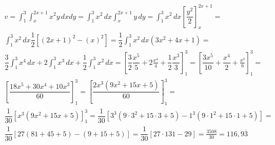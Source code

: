 \begin{enumerate}
	\begin{gather*}
		v = \int_1^3 \int_x^{2x + 1} x^2y\, dx dy = \int_1^3 x^2\, dx \int_x^{2x + 1} y\, dy =  \int_1^3 x^2\, dx \left[\dfrac{y^2}{2}\right]_x^{2x + 1} =\\  \int_1^3 x^2\, dx \dfrac{1}{2}\left[(2x + 1)^2 - (x)^2\right] = \dfrac{1}{2}\int_1^3 x^2\, dx \left(3x^2 + 4x + 1\right) =\\ \dfrac{3}{2}\int_1^3 x^4\, dx + 2\int_1^3 x^3\, dx + \dfrac{1}{2}\int_1^3 x^2\, dx = \left[\dfrac{3}{2}\dfrac{x^5}{5} + 2\frac{x^4}{4} + \dfrac{1}{2}\dfrac{x^3}{3}\right]_1^3 = \left[\dfrac{3x^5}{10} + \dfrac{x^4}{2} + \frac{x^3}{6}\right]_1^3 =\\ \left[\dfrac{18x^5 + 30x^4 + 10x^3}{60}\right]_1^3 = \left[\dfrac{2x^3\left(9x^2 + 15x + 5\right)}{60}\right]_1^3 =\\ \dfrac{1}{30}\left[x^3\left(9x^2 + 15x + 5\right)\right]_1^3 = \dfrac{1}{30}\left[3^3\left(9\cdot3^2 + 15\cdot3 + 5\right) - 1^3\left(9\cdot1^2 + 15\cdot1 + 5\right)\right] =\\ \dfrac{1}{30}\left[27(81 + 45 + 5) - (9 + 15 + 5)\right] = \dfrac{1}{30}\left[27\cdot131 - 29\right] = \frac{3508}{30} = 116,9\overline{3}	
	\end{gather*}
\end{enumerate}